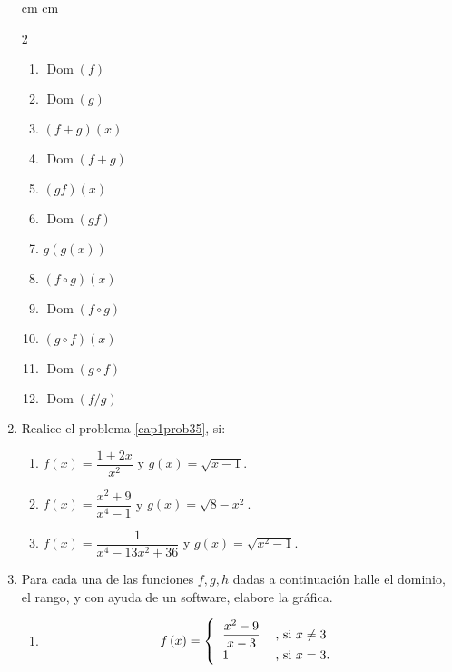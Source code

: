 \begin{enumerate}
 cm  cm\begin{multicols}
{2}
\begin{enumerate}
\item$\operatorname*{Dom}(f)$
\item$\operatorname*{Dom}(g)$
\item$\left(  f + g\right)            \left(
x\right)            $ \item $\operatorname*{Dom}(f + g)$
\item$\left(            gf\right) \left(   x\right)
$ \item$\operatorname*{Dom}(gf)$ \item$g\left(  g\left(
x\right)            \right) $
\item$\left(  f\circ g\right)            \left(
x\right)
$ \item $\operatorname*{Dom}(f\circ g)$
\item$\left(            g\circ f\right) \left(   x\right)$
\item$\operatorname*{Dom}(g\circ f)$
\item $\operatorname*{Dom}(f/g)$
\end{enumerate}
\end{multicols}\vspace{-0.9in}

\item Realice el problema \ref{cap1prob35}, si:

\begin{enumerate}
\item $f\left(  x\right)  =\dfrac{1+2x}{x^{2}}$ y $g\left(  x\right)
=\sqrt{x-1}.$

\item $f\left(  x\right)  =\dfrac{x^{2}+9}{x^{4}-1}$ y $g\left(  x\right)
=\sqrt{8-x^{2}}.$

\item $f\left(  x\right)  =\dfrac{1}{x^{4}-13x^{2}+36}$ y $g\left(  x\right)
=\sqrt{x^{2}-1}.$
\end{enumerate}

\item Para cada una de las funciones $f,g,h$ dadas a continuaci\'{o}n halle el
dominio, el rango, y con ayuda de un software, elabore la gr\'{a}fica.

\begin{enumerate}
\item
\[
f\left(  x\right)  =\left\{
\begin{tabular}
[c]{cl}%
$\dfrac{x^{2}-9}{x-3}$ & , si $x\neq3$\\
\multicolumn{1}{l}{$1$} & , si $x=3.$%
\end{tabular}
\right.
\]



\end{enumerate}
\end{enumerate}
